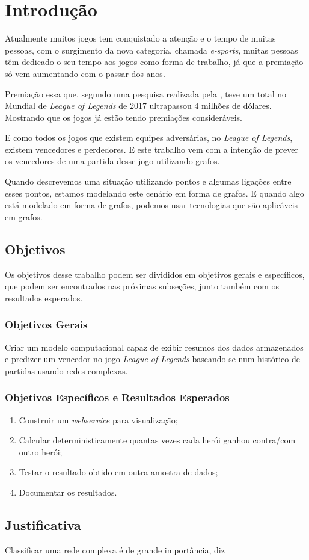 \chapter{Introdução}
\label{chap:Introducao}

Atualmente muitos jogos tem conquistado a atenção e o tempo de muitas pessoas, com o surgimento da nova categoria, chamada \textit{e-sports}, muitas pessoas têm dedicado o seu tempo aos jogos como forma de trabalho, já que a premiação só vem aumentando com o passar dos anos.

Premiação essa que, segundo uma pesquisa realizada pela \citet{espn}, teve um total no Mundial de \textit{League of Legends} de 2017 ultrapassou 4 milhões de dólares. Mostrando que os jogos já estão tendo premiações consideráveis.

E como todos os jogos que existem equipes adversárias, no \textit{League of Legends}, existem vencedores e perdedores. E este trabalho vem com a intenção de prever os vencedores de uma partida desse jogo utilizando grafos.

Quando descrevemos uma situação utilizando pontos e algumas ligações entre esses pontos, estamos modelando este cenário em forma de grafos. E quando algo está modelado em forma de grafos, podemos usar tecnologias que são aplicáveis em grafos.

\section{Objetivos}
Os objetivos desse trabalho podem ser divididos em objetivos gerais e específicos, que podem ser encontrados nas próximas subseções, junto também com os resultados esperados.
\subsection{Objetivos Gerais}
Criar um modelo computacional capaz de exibir resumos dos dados armazenados  e predizer um vencedor no jogo \textit{League of Legends} baseando-se num histórico de partidas usando redes complexas.

\subsection{Objetivos Específicos e Resultados Esperados}

\begin{enumerate}
\item Construir um \textit{webservice} para visualização;
\item Calcular deterministicamente quantas vezes cada herói ganhou contra/com outro herói;
\item Testar o resultado obtido em outra amostra de dados;
\item Documentar os resultados.

\end{enumerate}

\section{Justificativa}
Classificar uma rede complexa é de grande importância, \cite{asd} diz 